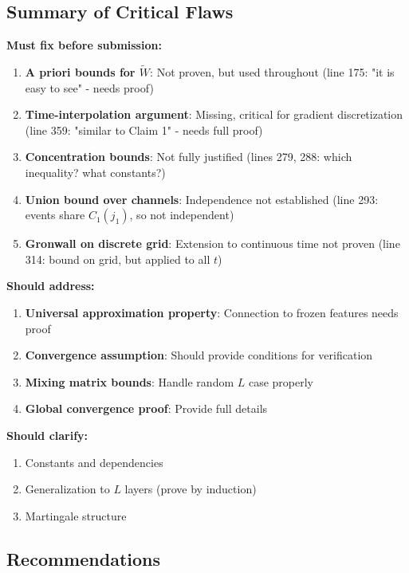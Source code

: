\subsection{Summary of Critical Flaws}

\textbf{Must fix before submission:}
\begin{enumerate}
\item \textbf{A priori bounds for $\tilde{W}$}: Not proven, but used throughout (line 175: "it is easy to see" - needs proof)
\item \textbf{Time-interpolation argument}: Missing, critical for gradient discretization (line 359: "similar to Claim 1" - needs full proof)
\item \textbf{Concentration bounds}: Not fully justified (lines 279, 288: which inequality? what constants?)
\item \textbf{Union bound over channels}: Independence not established (line 293: events share $C_1(j_1)$, so not independent)
\item \textbf{Gronwall on discrete grid}: Extension to continuous time not proven (line 314: bound on grid, but applied to all $t$)
\end{enumerate}

\textbf{Should address:}
\begin{enumerate}
\item \textbf{Universal approximation property}: Connection to frozen features needs proof
\item \textbf{Convergence assumption}: Should provide conditions for verification
\item \textbf{Mixing matrix bounds}: Handle random $L$ case properly
\item \textbf{Global convergence proof}: Provide full details
\end{enumerate}

\textbf{Should clarify:}
\begin{enumerate}
\item Constants and dependencies
\item Generalization to $L$ layers (prove by induction)
\item Martingale structure
\end{enumerate}

\subsection{Recommendations}

